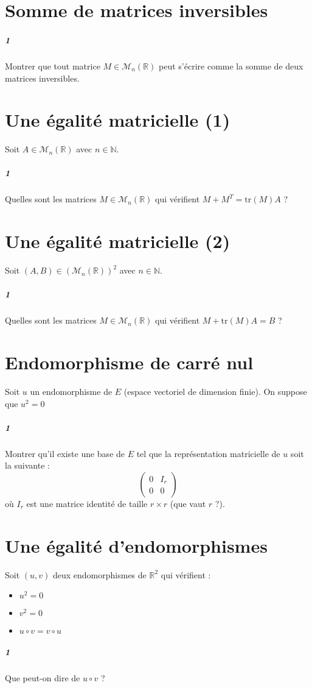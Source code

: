 \documentclass[10pt,a4paper]{article}
\begin{document}
\section{Somme de matrices inversibles}
\subparagraph{1}Montrer que tout matrice $M \in \mathcal{M}_n \left( \mathbb{R} \right)$ peut s'écrire comme la somme de deux matrices inversibles.

\section{Une égalité matricielle (1)}
Soit $A \in \mathcal{M}_n \left( \mathbb{R} \right)$ avec $n \in \mathbb{N}$.
\subparagraph{1}Quelles sont les matrices $M \in \mathcal{M}_n \left( \mathbb{R} \right)$ qui vérifient $M+M^T = \text{tr}(M) A$ ?

\section{Une égalité matricielle (2)}
Soit $(A,B) \in \left( \mathcal{M}_n \left( \mathbb{R} \right) \right)^2$ avec $n \in \mathbb{N}$.
\subparagraph{1}Quelles sont les matrices $M \in \mathcal{M}_n \left( \mathbb{R} \right)$ qui vérifient $M + \text{tr}(M)A = B$ ?

\section{Endomorphisme de carré nul}
Soit $u$ un endomorphisme de $E$ (espace vectoriel de dimension finie). On suppose que $u^2=0$
\subparagraph{1}Montrer qu'il existe une base de $E$ tel que la représentation matricielle de $u$ soit la suivante :
\[
\left( \begin{matrix} 0 & I_r \\ 0 & 0 \end{matrix} \right)
\]
où $I_r$ est une matrice identité de taille $r \times r$ (que vaut $r$ ?).

\section{Une égalité d'endomorphismes}
Soit $(u,v)$ deux endomorphismes de $\mathbb{R}^2$ qui vérifient :
\begin{itemize}
\item $u^2=0$
\item $v^2=0$
\item $u \circ v = v \circ u$
\end{itemize}
\subparagraph{1}Que peut-on dire de $u \circ v$ ?
\end{document}
